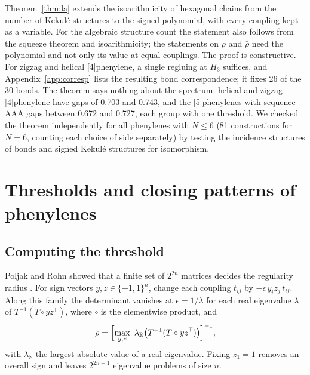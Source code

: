\documentclass[11pt]{article}
\newcommand{\T}{\mathsf{T}}
\begin{document}
Theorem~\ref{thm:la} extends the isoarithmicity of hexagonal chains \citep{GordonDavison1952,BalabanTomescu1983} from the number of Kekul\'e structures to the signed polynomial, with every coupling kept as a variable. For the algebraic structure count the statement also follows from the squeeze theorem \citep{Gutman1993} and isoarithmicity; the statements on $\rho$ and $\bar\rho$ need the polynomial and not only its value at equal couplings. The proof is constructive. For zigzag and helical [4]phenylene, a single regluing at $H_3$ suffices, and Appendix~\ref{app:corresp} lists the resulting bond correspondence; it fixes 26 of the 30 bonds. The theorem says nothing about the spectrum: helical and zigzag [4]phenylene have gaps of 0.703 and 0.743, and the [5]phenylenes with sequence AAA gaps between 0.672 and 0.727, each group with one threshold. We checked the theorem independently for all phenylenes with $N\le6$ (81 constructions for $N=6$, counting each choice of side separately) by testing the incidence structures of bonds and signed Kekul\'e structures for isomorphism.

\section{Thresholds and closing patterns of phenylenes}
\label{sec:phenylenes}

\subsection{Computing the threshold}

Poljak and Rohn showed that a finite set of $2^{2n}$ matrices decides the regularity radius \citep{PoljakRohn1993,HartmanHladik2018}. For sign vectors $y,z\in\{-1,1\}^n$, change each coupling $t_{ij}$ by $-\epsilon\,y_iz_j\,t_{ij}$. Along this family the determinant vanishes at $\epsilon=1/\lambda$ for each real eigenvalue $\lambda$ of $T^{-1}(T\circ yz^\T)$, where $\circ$ is the elementwise product, and
\begin{equation}
\rho=\Bigl[\max_{y,z}\ \lambda_{\mathbb R}\bigl(T^{-1}(T\circ yz^\T)\bigr)\Bigr]^{-1},
\label{eq:rohn}
\end{equation}
with $\lambda_{\mathbb R}$ the largest absolute value of a real eigenvalue. Fixing $z_1=1$ removes an overall sign and leaves $2^{2n-1}$ eigenvalue problems of size $n$.
\end{document}
